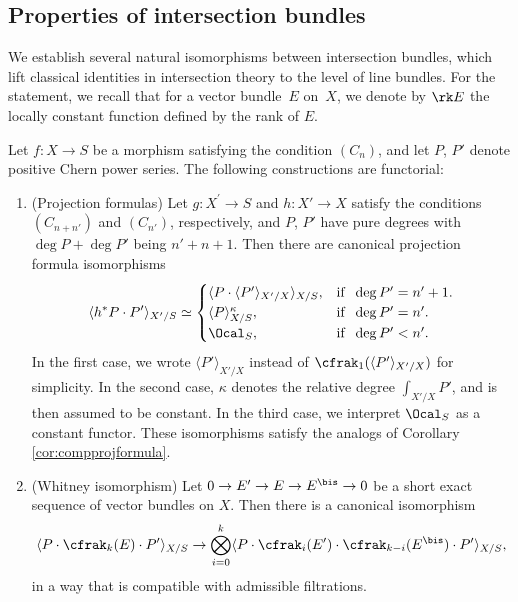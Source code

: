 \subsection{Properties of intersection bundles}\label{subsec:properties-of-intersection-bundles} We establish several natural isomorphisms between intersection bundles, which lift classical identities in intersection theory to the level of line bundles. For the statement, we recall that for a vector bundle~$E$ on~$X$, we denote by $\rk E$ the locally constant function defined by the rank of $E$.

\begin{proposition} \label{prop:properties-chern-bundles}
Let $f\colon X\to S$ be a morphism satisfying the condition $(C_{n})$, and let $P$, $P'$ denote positive Chern power series. The following constructions are functorial:
\begin{enumerate}

\item\label{item:projection-fromula} (Projection formulas) Let $g\colon X^{\prime}\to S$ and $h \colon X' \to X$ satisfy the conditions $(C_{n+n'})$ and $(C_{n'})$, respectively, and $P$, $P'$ have pure degrees with $\deg P + \deg P'$ being $n'+n+1$. Then there are canonical projection formula isomorphisms
\begin{displaymath}
\langle h^\ast P \cdot P' \rangle_{X'/S} \simeq
\begin{cases}
\langle P\cdot \langle P' \rangle_{X'/X} \rangle_{X/S}, & \text{if }\; \deg P^{\prime}=n^{\prime}+1.\\
\langle P \rangle_{X/S}^{\kappa}, & \text{if }\; \deg P^{\prime} = n^{\prime}. \\
\Ocal_S, & \text{if }\; \deg P^{\prime} < n^{\prime}.
\end{cases}
\end{displaymath}
In the first case, we wrote $\langle P' \rangle_{X'/X}$ instead of $\cfrak_{1}(\langle P' \rangle_{X'/X})$ for simplicity. In the second case, $\kappa$ denotes the relative degree $\int_{X'/X} P'$, and is then assumed to be constant. In the third case, we interpret $\Ocal_S$ as a constant functor. These isomorphisms satisfy the analogs of Corollary \ref{cor:compprojformula}.

\item \label{whitneyiso} (Whitney isomorphism) Let $0 \to E^{\prime}\to E \to E^{\bis} \to 0$ be a short exact sequence of vector bundles on $X$. Then there is a canonical isomorphism
\begin{displaymath}
\langle P \cdot \cfrak_{k}(E)\cdot P'\rangle_{X/S} \to \bigotimes_{i=0}^{k} \langle P \cdot \cfrak_{i}(E^{\prime}) \cdot \cfrak_{k-i}(E^{\bis})\cdot P' \rangle_{X/S},
\end{displaymath}
in a way that is compatible with admissible filtrations.


\end{enumerate}
\end{proposition}
